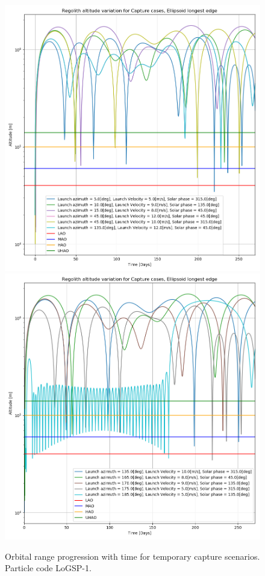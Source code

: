 \begin{figure}[p]
\centering
\captionsetup{justification=centering}
\includegraphics[scale=0.5]{longest_edge_perturbations/3.2Density_1cmSize/altitude_versus_time_all_cases_part_1.png}
\includegraphics[scale=0.5]{longest_edge_perturbations/3.2Density_1cmSize/altitude_versus_time_all_cases_part_2.png}
\caption{Orbital range progression with time for temporary capture scenarios. Particle code LoGSP-1.}
\label{fig:LoGSP_1_capture_orbital_range}
\end{figure}
